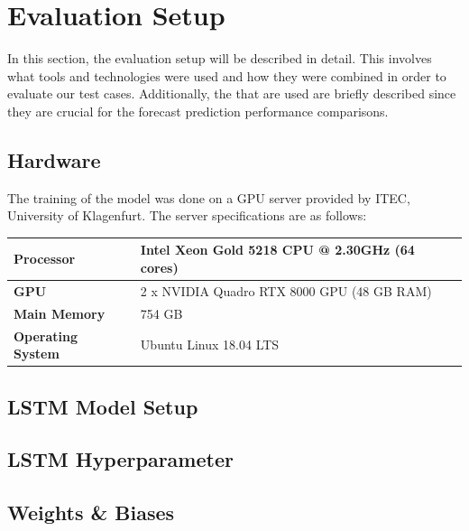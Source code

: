 \section{Evaluation Setup}
\label{sec:evaluation-setup}

  In this section, the evaluation setup will be described in detail. 
  This involves what tools and technologies were used and how they were combined in order to evaluate our test cases. Additionally, the  that are used are briefly described since they are crucial for the forecast prediction performance comparisons.
  
  \subsection{Hardware}
  \label{sec:hardware}

    The training of the  model was done on a GPU server provided by ITEC, University of Klagenfurt. The server specifications are as follows:

    \begin{center}
      \begin{tabular}{| l | l |}
        \hline
        \textbf{Processor}   &   Intel Xeon Gold 5218 CPU @ 2.30GHz (64 cores) \\ \hline
        \textbf{GPU}         &   2 x NVIDIA Quadro RTX 8000 GPU (48 GB RAM)    \\ \hline
        \textbf{Main Memory} &   754 GB                                        \\ \hline
        \textbf{Operating System} &  Ubuntu Linux 18.04 LTS                    \\ \hline

        \hline
      \end{tabular}
      \end{center}


  \subsection{LSTM Model Setup}

  \subsection{LSTM Hyperparameter}
  \label{sec:lstm-hyperparameters-evaluation-setup}


  \subsection{Weights \& Biases}
  \label{sec:wandb-evaluation-setup}
    
